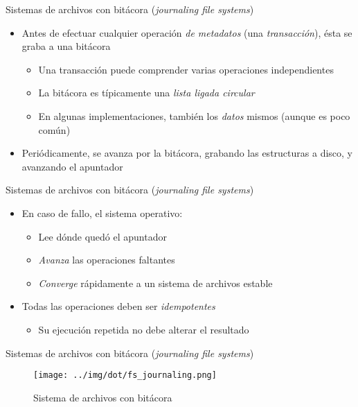 \documentclass[presentation]{beamer}
\begin{document}
\begin{frame}[label={sec:org1506ab5}]{Sistemas de archivos con bitácora (\emph{journaling file systems})}
\begin{itemize}
\item Antes de efectuar cualquier operación \emph{de metadatos} (una
\emph{transacción}), ésta se graba a una bitácora
\begin{itemize}
\item Una transacción puede comprender varias operaciones independientes
\item La bitácora es típicamente una \emph{lista ligada circular}
\item En algunas implementaciones, también los \emph{datos} mismos (aunque es
poco común)
\end{itemize}
\item Periódicamente, se avanza por la bitácora, grabando las estructuras
a disco, y avanzando el apuntador
\end{itemize}
\end{frame}

\begin{frame}[label={sec:org4a21364}]{Sistemas de archivos con bitácora (\emph{journaling file systems})}
\begin{itemize}
\item En caso de fallo, el sistema operativo:
\begin{itemize}
\item Lee dónde quedó el apuntador
\item \emph{Avanza} las operaciones faltantes
\item \emph{Converge} rápidamente a un sistema de archivos estable
\end{itemize}
\item Todas las operaciones deben ser \emph{idempotentes}
\begin{itemize}
\item Su ejecución repetida no debe alterar el resultado
\end{itemize}
\end{itemize}
\end{frame}

\begin{frame}[label={sec:orgc2378c2}]{Sistemas de archivos con bitácora (\emph{journaling file systems})}
\begin{figure}[htbp]
\centering
\texttt{[image: ../img/dot/fs\_journaling.png]}
\caption{Sistema de archivos con bitácora}
\end{figure}
\end{frame}
\end{document}
